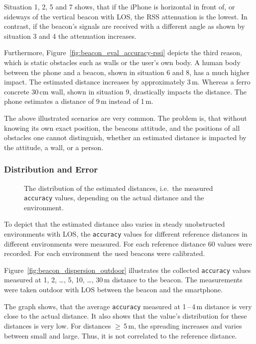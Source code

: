 \noindent Situation 1, 2, 5 and 7 shows, that if the iPhone is horizontal in front of, or sideways of the vertical beacon with \acs{LOS}, the \acs{RSS} attenuation is the lowest. In contrast, if the beacon's signals are received with a different angle as shown by situation 3 and 4 the attenuation increases.

Furthermore, Figure~\ref{fig:beacon_eval_accuracy-rssi} depicts the third reason, which is static obstacles such as walls or the user's own body. A human body between the phone and a beacon, shown in situation 6 and 8, has a much higher impact. The estimated distance increases by approximately 3\,m. Whereas a ferro concrete 30\,cm wall, shown in situation 9, drastically impacts the distance. The phone estimates a distance of 9\,m instead of 1\,m.

The above illustrated scenarios are very common. The problem is, that without knowing its own exact position, the beacons attitude, and the positions of all obstacles one cannot distinguish, whether an estimated distance is impacted by the attitude, a wall, or a person.


\subsubsection*{Distribution and Error}
\begin{figure}
	
	\caption{The distribution of the estimated distances, i.e.\ the measured \texttt{accuracy} values, depending on the actual distance and the environment.}
	\label{fig:beacon_dispersion}
\end{figure}

To depict that the estimated distance also varies in steady unobstructed environments with \acs{LOS}, the \texttt{accuracy} values for different reference distances in different environments were measured. For each reference distance 60 values were recorded. For each environment the used beacons were calibrated.

Figure~\ref{fig:beacon_dispersion_outdoor} illustrates the collected \texttt{accuracy} values measured at 1, 2, \ldots, 5, 10, \ldots, 30\,m distance to the beacon. The measurements were taken outdoor with \acl{LOS} between the beacon and the smartphone.

The graph shows, that the average \texttt{accuracy} measured at 1\,--\,4\,m distance is very close to the actual distance. It also shows that the value's distribution for these distances is very low. For distances $\geq$\,5\,m, the spreading increases and varies between small and large. Thus, it is not correlated to the reference distance.

